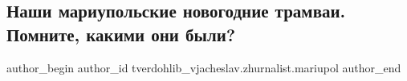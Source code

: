  
 
 
 
 

\subsection{Наши мариупольские новогодние трамваи. Помните, какими они были?}
\label{sec:18_12_2022.fb.tverdohlib_vjacheslav.zhurnalist.mariupol.1.nashi_mariupolskie_n}

\ifcmt
 author_begin
   author_id tverdohlib_vjacheslav.zhurnalist.mariupol
 author_end
\fi

